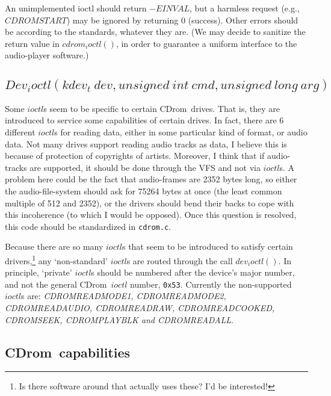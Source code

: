 \documentclass{article}
\def\cdrom{{\sc CDrom}}
\def\cdromc{{\tt cdrom.c}}
\begin{document}
An unimplemented ioctl should return $-EINVAL$, but a harmless request
(e.g., $CDROMSTART$) may be ignored by returning 0 (success). Other
errors should be according to the standards, whatever they are. (We
may decide to sanitize the return value in $cdrom_ioctl()$, in order
to guarantee a uniform interface to the audio-player software.)

\subsection{$Dev_ioctl(kdev_t\ dev, unsigned\ int\ cmd, unsigned\ long\
arg)$}

Some $ioctl$s seem to be specific to certain \cdrom\ drives. That is,
they are introduced to service some capabilities of certain drives. In
fact, there are 6 different $ioctl$s for reading data, either in some
particular kind of format, or audio data. Not many drives support
reading audio tracks as data, I believe this is because of protection
of copyrights of artists. Moreover, I think that if audio-tracks are
supported, it should be done through the VFS and not via $ioctl$s. A
problem here could be the fact that audio-frames are 2352 bytes long,
so either the audio-file-system should ask for 75264 bytes at once
(the least common multiple of 512 and 2352), or the drivers should
bend their backs to cope with this incoherence (to which I would be
opposed). Once this question is resolved, this code should be standardized in 
\cdromc.

Because there are so many $ioctl$s that seem to be introduced to
satisfy certain drivers,\footnote{Is there software around that actually uses
these? I'd be interested!} any `non-standard' $ioctl$s are routed through
the call $dev_ioctl()$. In principle, `private' $ioctl$s should be
numbered after the device's major number, and not the general \cdrom\
$ioctl$ number, {\tt 0x53}. Currently the non-supported $ioctl$s are:
{\it CDROMREADMODE1, CDROMREADMODE2, CDROMREADAUDIO, CDROMREADRAW,
CDROMREADCOOKED, CDROMSEEK, CDROMPLAY\-BLK and CDROMREADALL}. 

\subsection{\cdrom\ capabilities}
\end{document}
